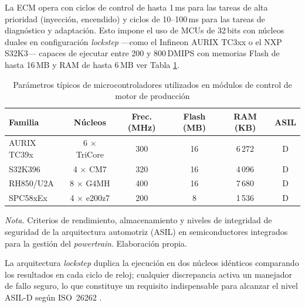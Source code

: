 La ECM opera con ciclos de control de hasta 1\,ms para las tareas de alta
prioridad (inyección, encendido) y ciclos de 10--100\,ms para las tareas de
diagnóstico y adaptación. Esto impone el uso de MCUs de 32\,bits con núcleos
duales en configuración \textit{lockstep} —como el Infineon AURIX TC3xx o el
NXP S32K3— capaces de ejecutar entre 200 y 800\,DMIPS con memorias Flash de
hasta 16\,MB y RAM de hasta 6\,MB \citep{Infineon2022, NXP2022} ver Tabla \ref{tab:mcu_ecm}.

\begin{table}[h]
	\centering
	\captionsetup{labelformat=simple, labelsep=newline, textfont=it, labelfont=bf}
	\caption{Parámetros típicos de microcontroladores utilizados en módulos de control de motor de producción}
	\label{tab:mcu_ecm}
	
	\renewcommand{\arraystretch}{1.25}
	
	\begin{tabularx}{\linewidth}{X c c c c c}
		\toprule %
		\rowcolor[rgb]{0.851, 0.851, 0.851}
		\textbf{Familia} & \textbf{Núcleos} & \textbf{Frec. (MHz)} & \textbf{Flash (MB)} & \textbf{RAM (KB)} & \textbf{ASIL} \\
		\midrule %
		AURIX TC39x & 6 $\times$ TriCore & 300 & 16 & 6\,272 & D \\
		\addlinespace
		S32K396 & 4 $\times$ CM7 & 320 & 16 & 4\,096 & D \\
		\addlinespace
		RH850/U2A & 8 $\times$ G4MH & 400 & 16 & 7\,680 & D \\
		\addlinespace
		SPC58xEx & 4 $\times$ e200z7 & 200 & 8 & 1\,536 & D \\
		\bottomrule %
	\end{tabularx}
	\vspace{0.2cm}
	
	\begin{flushleft}
		\footnotesize \textit{Nota.} Criterios de rendimiento, almacenamiento y niveles de integridad de seguridad de la arquitectura automotriz (ASIL) en semiconductores integrados para la gestión del \textit{powertrain}. Elaboración propia.
	\end{flushleft}
\end{table}

La arquitectura \textit{lockstep} duplica la ejecución en dos núcleos idénticos
comparando los resultados en cada ciclo de reloj; cualquier discrepancia activa
un manejador de fallo seguro, lo que constituye un requisito indispensable
para alcanzar el nivel ASIL-D según ISO~26262 \citep{ISO16750}.

